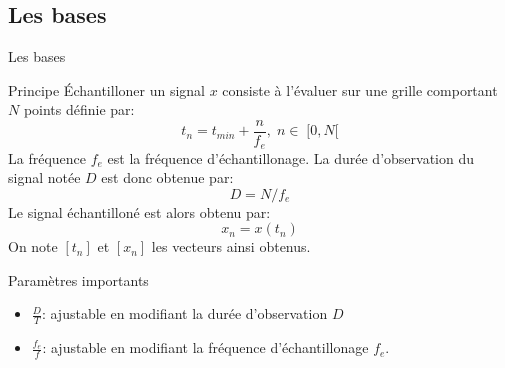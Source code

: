 \documentclass[8pt,a4paper]{beamer}
\begin{document}
  \subsection{Les bases}
  \begin{frame}{Les bases}
  \begin{block}{Principe}
  \'Echantilloner un signal $x$ consiste à l'évaluer sur une grille comportant $N$ points définie par:
  $$
  t_n = t_{min}+\frac{n}{f_e}, \; n \in \; [0,N[
  $$
  La fréquence $f_e$ est la fréquence d'échantillonage. La durée d'observation du signal notée $D$ est donc obtenue par:
  $$
  D = N/f_e
  $$
  Le signal échantilloné est alors obtenu par:
  $$
  x_n=x(t_n)
  $$
  On note $[t_n]$ et $[x_n]$ les vecteurs ainsi obtenus.
  \end{block}
  \begin{block}{Paramètres importants}  
  \begin{itemize}
  \item $\frac{D}{T}$: ajustable en modifiant la durée d'observation $D$
  \item $\frac{f_e}{f}$: ajustable en modifiant la fréquence d'échantillonage $f_e$.
  \end{itemize}
  \end{block}
  \end{frame}
  
\end{document}
